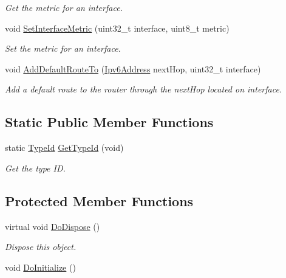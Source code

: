 \begin{DoxyCompactItemize}
\begin{DoxyCompactList}\small\item\em Get the metric for an interface. \end{DoxyCompactList}\item 
void \hyperlink{classns3_1_1RipNg_a98e6039328b6d70dd97bfd8edbf24ba3}{Set\+Interface\+Metric} (uint32\+\_\+t interface, uint8\+\_\+t metric)
\begin{DoxyCompactList}\small\item\em Set the metric for an interface. \end{DoxyCompactList}\item 
void \hyperlink{classns3_1_1RipNg_aec1f0a59262b185e302f69395a615a87}{Add\+Default\+Route\+To} (\hyperlink{classns3_1_1Ipv6Address}{Ipv6\+Address} next\+Hop, uint32\+\_\+t interface)
\begin{DoxyCompactList}\small\item\em Add a default route to the router through the next\+Hop located on interface. \end{DoxyCompactList}\end{DoxyCompactItemize}
\subsection*{Static Public Member Functions}
\begin{DoxyCompactItemize}
\item 
static \hyperlink{classns3_1_1TypeId}{Type\+Id} \hyperlink{classns3_1_1RipNg_a4c5b07bdfcaaf3537f880d37a311a221}{Get\+Type\+Id} (void)
\begin{DoxyCompactList}\small\item\em Get the type ID. \end{DoxyCompactList}\end{DoxyCompactItemize}
\subsection*{Protected Member Functions}
\begin{DoxyCompactItemize}
\item 
virtual void \hyperlink{classns3_1_1RipNg_a052d51c5f6f76871e12491780ab3ebf5}{Do\+Dispose} ()
\begin{DoxyCompactList}\small\item\em Dispose this object. \end{DoxyCompactList}\item 
void \hyperlink{classns3_1_1RipNg_a81a7056d4a1d1afc266181406f5dbf64}{Do\+Initialize} ()
\end{DoxyCompactItemize}
